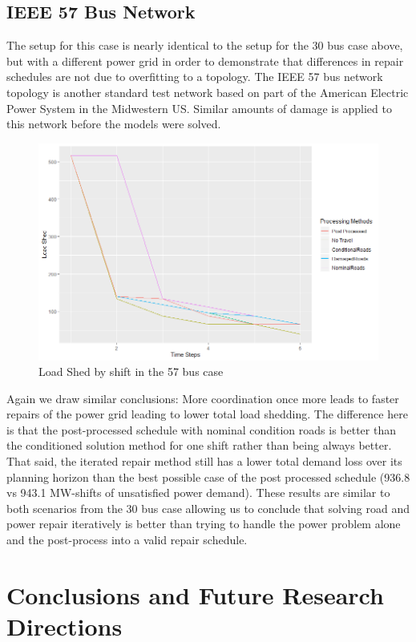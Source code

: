 \documentclass[10pt]{article}
\begin{document}
\subsection{IEEE 57 Bus Network}
 \vspace*{-12pt}
The setup for this case is nearly identical to the setup for the 30 bus case above, but with a different power grid in order to demonstrate that differences in repair schedules are not due to overfitting to a topology. The IEEE 57 bus network topology is another standard test network based on part of the American Electric Power System in the Midwestern US. Similar amounts of damage is applied to this network before the models were solved.

\begin{figure}[]
	\centering
	\caption{Load Shed by shift in the 57 bus case}
	\includegraphics[width=.5\textwidth, height=0.5\textheight,keepaspectratio]{RPlot57.png}
	
\end{figure}

Again we draw similar conclusions: More coordination once more leads to faster repairs of the power grid leading to lower total load shedding. The difference here is that the post-processed schedule with nominal condition roads is better than the conditioned solution method for one shift rather than being always better. That said, the iterated repair method still has a lower total demand loss over its planning horizon than the best possible case of the post processed schedule (936.8 vs 943.1 MW-shifts of unsatisfied power demand). These results are similar to both scenarios from the 30 bus case allowing us to conclude that solving road and power repair iteratively is better than trying to handle the power problem alone and the post-process into a valid repair schedule.
\section{\large{Conclusions and Future Research Directions}}
\label{sec:issues}
\vspace*{-12pt}
\end{document}
